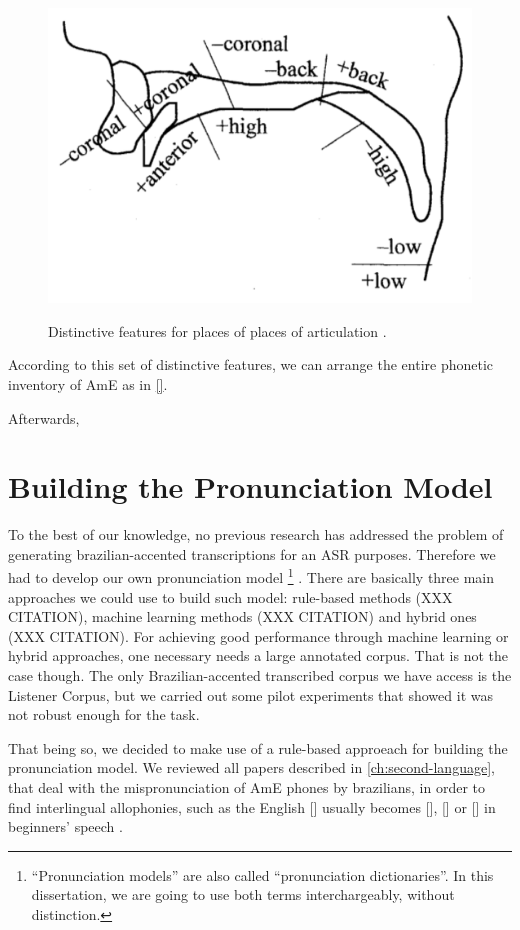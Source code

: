 \begin{figure}[!htb]
        \myfloatalign
        {\includegraphics[width=.66\linewidth]{gfx/features-place.png}}
        \caption{Distinctive features for places of places of articulation \citep{Jensen2004}.}
        \label{fig:features-place}
\end{figure}

According to this set of distinctive features, we can arrange the entire phonetic inventory of \ac{AmE} as in \autoref{}.

Afterwards, 


\section{Building the Pronunciation Model}

To the best of our knowledge, no previous research has addressed the problem of generating brazilian-accented 
transcriptions for an \ac{ASR} purposes. Therefore we had to develop our own pronunciation model
\footnote{``Pronunciation models'' are also called ``pronunciation dictionaries''. In this dissertation, we are going to use both terms interchargeably, without distinction.}
. There are basically 
three main approaches we could use to build such model: rule-based methods (XXX CITATION), machine learning methods (XXX CITATION)
and hybrid ones (XXX CITATION). For achieving good performance through machine learning or hybrid approaches, one necessary 
needs a large annotated corpus. That is not the case though. The only Brazilian-accented transcribed corpus we have access
is the Listener Corpus, but we carried out some pilot experiments that showed it was not robust enough for the task.

That being so, we decided to make use of a rule-based approeach for building the pronunciation model. We reviewed all papers 
described in \autoref{ch:second-language}, that deal with the mispronunciation of \ac{AmE} phones by brazilians, in order to find 
interlingual allophonies, such as the English [] usually becomes [], [] or [] in 
beginners' speech \citep{Reis2006}. 

